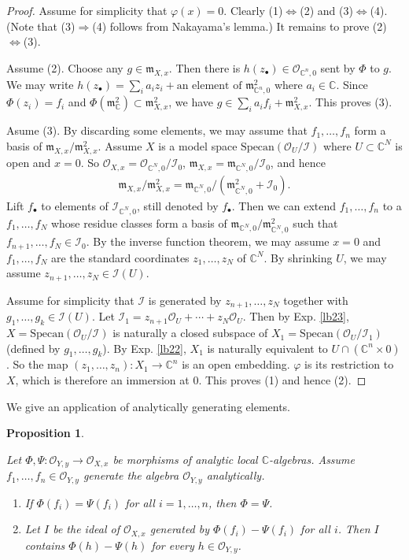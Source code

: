 \documentclass[12pt,b5paper,notitlepage]{report}
\theoremstyle{definition}
\theoremstyle{plain}
\newtheorem{pp}[df]{Proposition}
\newcommand{\fk}{\mathfrak}
\newcommand{\mc}{\mathcal}
\newcommand{\scr}{\mathscr}
\newcommand{\blt}{\bullet}
\newcommand{\Cbb}{\mathbb C}
\newcommand{\Specan}{\mathrm{Specan}}
\numberwithin{equation}{section}
\begin{document}
\begin{proof}
Assume for simplicity that $\varphi(x)=0$. Clearly (1)$\Leftrightarrow$(2) and (3)$\Leftrightarrow$(4). (Note that (3)$\Rightarrow$(4) follows from Nakayama's lemma.) It remains to prove (2)$\Leftrightarrow$(3). 

Assume (2). Choose any $g\in\fk m_{X,x}$. Then there is $h(z_\blt)\in\scr O_{\Cbb^n,0}$ sent by $\Phi$ to $g$. We may write $h(z_\blt)=\sum_i a_iz_i+\text{an element of }\fk m_{\Cbb^n,0}^2$ where $a_i\in\Cbb$. Since $\Phi(z_i)=f_i$ and $\Phi(\fk m_{\Cbb}^2)\subset\fk m_{X,x}^2$, we have $g\in \sum_i a_i f_i+\fk m_{X,x}^2$. This proves (3).

Asume (3). By discarding some elements, we may assume that $f_1,\dots,f_n$ form a basis of $\fk m_{X,x}/\fk m_{X,x}^2$. Assume $X$ is a model space $\Specan(\scr O_U/\mc I)$ where $U\subset\Cbb^N$ is open and $x=0$. So $\scr O_{X,x}=\scr O_{\Cbb^N,0}/\mc I_0$, $\fk m_{X,x}=\fk m_{\Cbb^N,0}/\mc I_0$, and hence
\begin{align*}
\fk m_{X,x}/\fk m_{X,x}^2=\fk m_{\Cbb^N,0}/(\fk m_{\Cbb^N,0}^2+\mc I_0).
\end{align*}
Lift $f_\blt$ to elements of $\mc I_{\Cbb^N,0}$, still denoted by $f_\blt$. Then we can extend $f_1,\dots,f_n$ to a $f_1,\dots,f_N$ whose residue classes form a basis of $\fk m_{\Cbb^N,0}/\fk m_{\Cbb^N,0}^2$ such that $f_{n+1},\dots,f_N\in\mc I_0$. By the inverse function theorem, we may assume $x=0$ and $f_1,\dots,f_N$ are the standard coordinates $z_1,\dots,z_N$ of $\Cbb^N$. By shrinking $U$, we may assume $z_{n+1},\dots,z_N\in\mc I(U)$.

Assume for simplicity that $\mc I$ is generated by $z_{n+1},\dots,z_N$ together with $g_1,\dots,g_k\in\mc I(U)$. Let $\mc I_1=z_{n+1}\scr O_U+\cdots+z_N\scr O_U$. Then by Exp. \ref{lb23}, $X=\Specan(\scr O_U/\mc I)$ is naturally a closed subspace of $X_1=\Specan(\scr O_U/\mc I_1)$ (defined by $g_1,\dots,g_k$). By Exp. \ref{lb22}, $X_1$ is naturally equivalent to $U\cap(\Cbb^n\times 0)$. So the map $(z_1,\dots,z_n):X_1\rightarrow \Cbb^n$ is an open embedding. $\varphi$ is its restriction to $X$, which is therefore an immersion at $0$. This proves (1) and hence (2).
\end{proof}



We give an application of analytically generating elements.


\begin{pp}\label{lb24}

\item Let $\Phi,\Psi:\scr O_{Y,y}\rightarrow\scr O_{X,x}$ be morphisms of analytic local $\Cbb$-algebras. Assume $f_1,\dots,f_n\in\scr O_{Y,y}$ generate the algebra $\scr O_{Y,y}$ analytically. 
\begin{enumerate}[label=(\arabic*)]
\item If $\Phi(f_i)=\Psi(f_i)$ for all $i=1,\dots,n$, then $\Phi=\Psi$.
\item Let $I$ be the ideal of $\scr O_{X,x}$ generated by $\Phi(f_i)-\Psi(f_i)$ for all $i$. Then $I$ contains $\Phi(h)-\Psi(h)$ for every $h\in\scr O_{Y,y}$.
\end{enumerate}
\end{pp}
\end{document}
